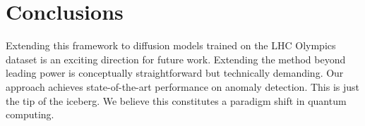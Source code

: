\section{Conclusions}\label{sec:conclusions}

Extending this framework to diffusion models trained on the LHC Olympics
dataset is an exciting direction for future work. Extending the method
beyond leading power is conceptually straightforward but technically
demanding. Our approach achieves state-of-the-art performance on anomaly
detection. This is just the tip of the iceberg. We believe this
constitutes a paradigm shift in quantum computing.

